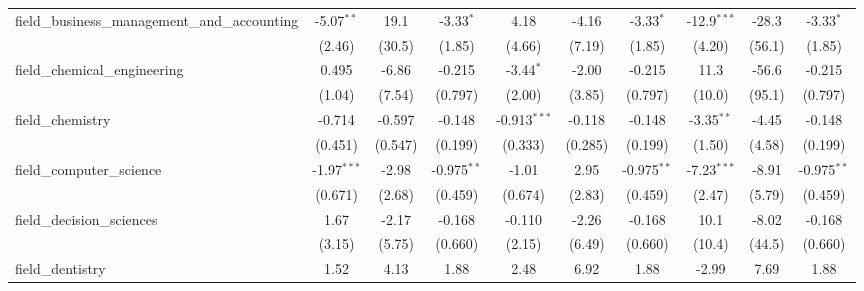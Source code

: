 \begin{tabular}{lccccccccc}
   field\_business\_management\_and\_accounting                & -5.07$^{**}$   & 19.1          & -3.33$^{*}$    & 4.18           & -4.16        & -3.33$^{*}$    & -12.9$^{***}$  & -28.3         & -3.33$^{*}$\\   
                                                               & (2.46)         & (30.5)        & (1.85)         & (4.66)         & (7.19)       & (1.85)         & (4.20)         & (56.1)        & (1.85)\\   
   field\_chemical\_engineering                                & 0.495          & -6.86         & -0.215         & -3.44$^{*}$    & -2.00        & -0.215         & 11.3           & -56.6         & -0.215\\   
                                                               & (1.04)         & (7.54)        & (0.797)        & (2.00)         & (3.85)       & (0.797)        & (10.0)         & (95.1)        & (0.797)\\   
   field\_chemistry                                            & -0.714         & -0.597        & -0.148         & -0.913$^{***}$ & -0.118       & -0.148         & -3.35$^{**}$   & -4.45         & -0.148\\   
                                                               & (0.451)        & (0.547)       & (0.199)        & (0.333)        & (0.285)      & (0.199)        & (1.50)         & (4.58)        & (0.199)\\   
   field\_computer\_science                                    & -1.97$^{***}$  & -2.98         & -0.975$^{**}$  & -1.01          & 2.95         & -0.975$^{**}$  & -7.23$^{***}$  & -8.91         & -0.975$^{**}$\\   
                                                               & (0.671)        & (2.68)        & (0.459)        & (0.674)        & (2.83)       & (0.459)        & (2.47)         & (5.79)        & (0.459)\\   
   field\_decision\_sciences                                   & 1.67           & -2.17         & -0.168         & -0.110         & -2.26        & -0.168         & 10.1           & -8.02         & -0.168\\   
                                                               & (3.15)         & (5.75)        & (0.660)        & (2.15)         & (6.49)       & (0.660)        & (10.4)         & (44.5)        & (0.660)\\   
   field\_dentistry                                            & 1.52           & 4.13          & 1.88           & 2.48           & 6.92         & 1.88           & -2.99          & 7.69          & 1.88\\   

\end{tabular}
